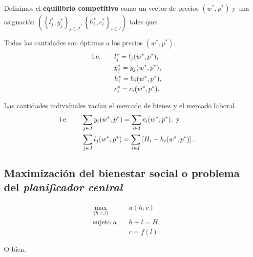 \documentclass[8pt,a4paper]{extarticle}
\begin{document}
\begin{multicols}{3}
	\begin{boxdef}
		Definimos el \textbf{equilibrio competitivo} como un vector de precios $(w^*, p^*)$ y una asignación $\left( \left\{ l^*_j, y^*_j \right\}_{j \in J}, \left\{ h^*_i, c^*_i \right\}_{i \in I} \right)$ tales que:
		\begin{eqlist}
			\item Todas las cantidades son óptimas a los precios $(w^*, p^*)$.
			\begin{equation*}
				\begin{aligned}
					\text{\normalfont i.e.} \qquad & l^*_j = l_j(w^*, p^*), \\
					           & y^*_j = y_j(w^*, p^*), \\
					           & h^*_i = h_i(w^*, p^*), \\
					           & c^*_i = c_i(w^*, p^*).
				\end{aligned}
			\end{equation*}
			\item Las cantidades individuales vacían el mercado de bienes y el mercado laboral.
			\begin{equation*}
				\begin{aligned}
					\text{\normalfont i.e.} \qquad & \sum_{j \in J} y_i(w^*, p^*) = \sum_{i \in I} c_i(w^*, p^*),\ \text{y}            \\
					           & \sum_{j \in J} l_j(w^*, p^*) = \sum_{i \in I} \left[ H_i - h_i(w^*, p^*) \right].
				\end{aligned}
			\end{equation*}
		\end{eqlist}
	\end{boxdef}

	\newpage

	\subsection{Maximización del bienestar social o problema del \emph{planificador central}}

	\begin{equation*}
		\begin{aligned}
			\max_{\{h, c, l\}} \quad & u(h, c)    \\
			\text{sujeto a} \quad    & h + l = H, \\
			                         & c = f(l).
		\end{aligned}
	\end{equation*}

	O bien,


\end{multicols}
\end{document}
